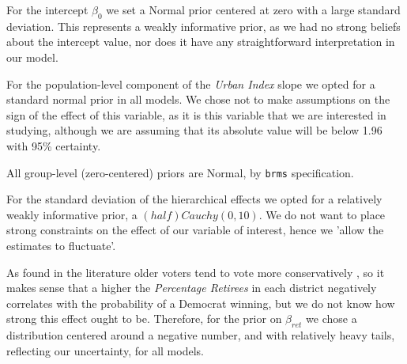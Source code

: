 \documentclass[12pt]{article}
\newcommand{\red}[1]{\textcolor{red}{#1}}
\newcommand{\blue}[1]{\textcolor{blue}{#1}}
\begin{document}

For the intercept $\beta_0$ we set a Normal prior centered at zero with a large standard deviation. 
This represents a weakly informative prior, as we had no strong beliefs about the intercept value, nor does it have any straightforward interpretation in our model.


For the population-level component of the \textit{Urban Index} slope we opted for a standard normal prior in all models. We chose not to make assumptions on the sign of the effect of this variable, as it is this variable that we are interested in studying, although we are assuming that its absolute value will be below 1.96 with 95\% certainty. 

All group-level (zero-centered) priors are Normal, by \verb|brms| specification. 

For the standard deviation of the hierarchical effects we opted for a relatively weakly informative prior, a $(half)Cauchy(0,10)$.
We do not want to place strong constraints on the effect of our variable of interest, hence we 'allow the estimates to fluctuate'.



As found in the literature older voters tend to vote more conservatively \parencite{brown2022oldvoters}, so it makes sense that a higher the \textit{Percentage Retirees} in each district negatively correlates with the probability of a Democrat winning, but we do not know how strong this effect ought to be. Therefore, for the prior on $\beta_{ret}$ we chose a distribution centered around a negative number, and with relatively heavy tails, reflecting our uncertainty, for all models. 
\end{document}
